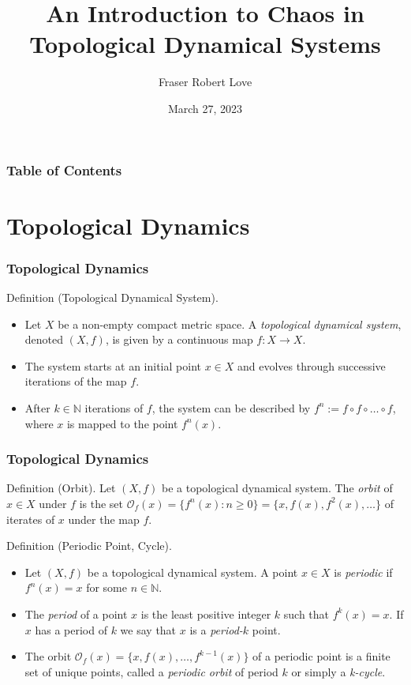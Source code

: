 \documentclass{beamer}
\title{An Introduction to Chaos in Topological Dynamical Systems}
\author{Fraser Robert Love}
\institute{School of Mathematics and Statistics \\ University of St Andrews}
\date{March 27, 2023}
\begin{document}
\frame{\titlepage}

\begin{frame}
    \frametitle{Table of Contents}
    \tableofcontents
\end{frame}

\section{Topological Dynamics}
\begin{frame}
    \frametitle{Topological Dynamics}

    \begin{block}{Definition (Topological Dynamical System).}
        \begin{itemize}
            \item Let $X$ be a non-empty compact metric space. A \emph{topological dynamical system}, denoted $(X, f)$, is given by a continuous map $f: X \to X$. 
            \item The system starts at an initial point $x \in X$ and evolves through successive iterations of the map $f$.
            \item After $k \in \mathbb{N}$ iterations of $f$, the system can be described by $f^n := f \circ f \circ \dots \circ f$, where $x$ is mapped to the point $f^n(x)$.
        \end{itemize}
    \end{block}
\end{frame}

\begin{frame}
    \frametitle{Topological Dynamics}

    \begin{block}{Definition (Orbit).}
        Let $(X, f)$ be a topological dynamical system. The \emph{orbit} of $x \in X$ under $f$ is the set $\mathcal{O}_f(x) = \lbrace f^n(x) : n \geq 0 \rbrace = \lbrace x, f(x), f^2(x), \dots \rbrace$ of iterates of $x$ under the map $f$.
    \end{block}

    \begin{block}{Definition (Periodic Point, Cycle).}
        \begin{itemize}
            \item Let $(X, f)$ be a topological dynamical system. A point $x \in X$ is \emph{periodic} if $f^n(x) = x$ for some $n \in \mathbb{N}$.
            \item The \emph{period} of a point $x$ is the least positive integer $k$ such that $f^k(x) = x$. If $x$ has a period of $k$ we say that $x$ is a \emph{period-$k$} point.
            \item The orbit $\mathcal{O}_f(x) = \lbrace x, f(x), \dots, f^{k-1}(x) \rbrace$ of a periodic point is a finite set of unique points, called a \emph{periodic orbit} of period $k$ or simply a \emph{k-cycle}.
        \end{itemize}
    \end{block}
\end{frame}
\end{document}
